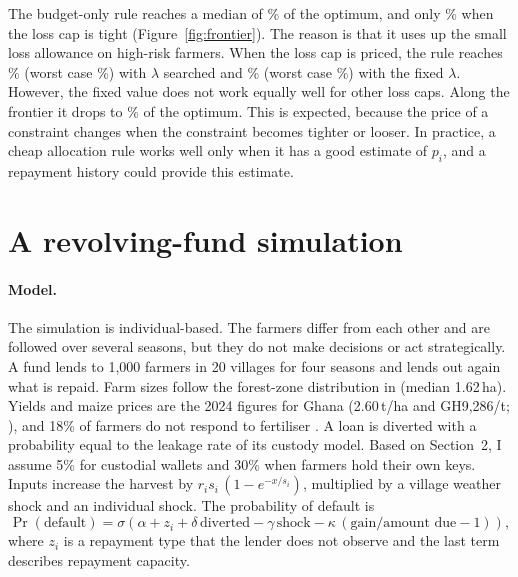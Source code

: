 \documentclass[11pt]{article}
\begin{document}
The budget-only rule reaches a median of \GreedyMed\% of the optimum, and only
\GreedyTightest\% when the loss cap is tight (Figure~\ref{fig:frontier}). The reason is that it
uses up the small loss allowance on high-risk farmers. When the loss cap is priced, the rule
reaches \GreedyRiskMed\% (worst case \GreedyRiskMin\%) with $\lambda$ searched and
\FixedMed\% (worst case \FixedMin\%) with the fixed $\lambda$. However, the fixed value does
not work equally well for other loss caps. Along the frontier it drops to
\FixedFrontierMin\% of the optimum. This is expected, because the price of a constraint
changes when the constraint becomes tighter or looser. In practice, a cheap allocation rule
works well only when it has a good estimate of $p_i$, and a repayment history could provide
this estimate.

\section{A revolving-fund simulation}

\paragraph{Model.} The simulation is individual-based. The farmers differ from each other and
are followed over several seasons, but they do not make decisions or act strategically. A fund
lends to 1{,}000 farmers in 20 villages for four seasons and lends out again what is repaid.
Farm sizes follow the forest-zone distribution in \citet{chamberlin2008} (median 1.62\,ha).
Yields and maize prices are the 2024 figures for Ghana (2.60\,t/ha and GH\textcent{}9{,}286/t;
\citealp{srid2024}), and 18\% of farmers do not respond to fertiliser \citep{ichami2019}. A
loan is diverted with a probability equal to the leakage rate of its custody model. Based on
Section~2, I assume 5\% for custodial wallets and 30\% when farmers hold their own keys.
Inputs increase the harvest by $r_i s_i\,(1-e^{-x/s_i})$, multiplied by a village weather
shock and an individual shock. The probability of default is
\begin{equation}
\Pr(\text{default}) = \sigma\!\left(\alpha + z_i + \delta\,\text{diverted} - \gamma\,\text{shock}
- \kappa\,(\text{gain}/\text{amount due} - 1)\right),
\end{equation}
where $z_i$ is a repayment type that the lender does not observe and the last term describes
repayment capacity.
\end{document}

